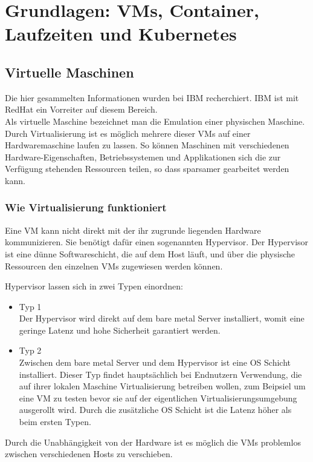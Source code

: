 \chapter{Grundlagen: VMs, Container, Laufzeiten und Kubernetes}

\section{Virtuelle Maschinen} 
Die hier gesammelten Informationen wurden bei IBM\cite{vm} recherchiert. IBM ist mit RedHat ein Vorreiter auf diesem Bereich.\\
Als virtuelle Maschine bezeichnet man die Emulation einer physischen Maschine.
Durch Virtualisierung ist es möglich mehrere dieser \ac{VM}s auf einer Hardwaremaschine laufen zu lassen.
So können Maschinen mit verschiedenen Hardware-Eigenschaften, Betriebssystemen und Applikationen sich die zur Verfügung stehenden Ressourcen teilen, so dass sparsamer gearbeitet werden kann.

\subsection{Wie Virtualisierung funktioniert}
Eine \ac{VM} kann nicht direkt mit der ihr zugrunde liegenden Hardware kommunizieren. 
Sie benötigt dafür einen sogenannten Hypervisor.
Der Hypervisor ist eine dünne Softwareschicht, die auf dem Host läuft, und über die physische Ressourcen den einzelnen \ac{VM}s zugewiesen werden können.

Hypervisor lassen sich in zwei Typen einordnen:
\begin{itemize}
    \item Typ 1 \\ 
            Der Hypervisor wird direkt auf dem bare metal Server installiert, womit eine geringe Latenz und hohe Sicherheit garantiert werden.
    \item Typ 2\\
            Zwischen dem bare metal Server und dem Hypervisor ist eine \ac{OS} Schicht installiert. 
            Dieser Typ findet hauptsächlich bei Endnutzern Verwendung, die auf ihrer lokalen Maschine Virtualisierung betreiben wollen, zum Beipsiel um eine \ac{VM} zu testen bevor sie auf der eigentlichen Virtualisierungsumgebung ausgerollt wird.
            Durch die zusätzliche \ac{OS} Schicht ist die Latenz höher als beim ersten Typen.
\end{itemize}

Durch die Unabhängigkeit von der Hardware ist es möglich die \ac{VM}s problemlos zwischen verschiedenen Hosts zu verschieben. \\

